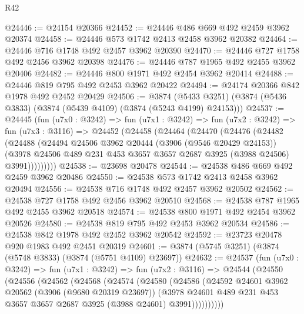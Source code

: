 \begin{lexlean}{R42}
\begin{coremodule}
@24446 := @24154 @20366
@24452 := @24446 @486 @669 @492 @2459 @3962 @20374
@24458 := @24446 @573 @1742 @2413 @2458 @3962 @20382
@24464 := @24446 @716 @1748 @492 @2457 @3962 @20390
@24470 := @24446 @727 @1758 @492 @2456 @3962 @20398
@24476 := @24446 @787 @1965 @492 @2455 @3962 @20406
@24482 := @24446 @800 @1971 @492 @2454 @3962 @20414
@24488 := @24446 @819 @795 @492 @2453 @3962 @20422
@24494 := @24174 @20366 @842 @1978 @492 @2452 @20429
@24506 := @3874
    (@5433 @3251)
    (@3874 (@5436 @3833) (@3874 (@5439 @4109) (@3874 (@5243 @4199) @24153)))
@24537 := @24445
    (fun (u7x0 : @3242) =>
    fun (u7x1 : @3242) =>
    fun (u7x2 : @3242) =>
    fun (u7x3 : @3116) =>
    @24452
      (@24458
        (@24464
          (@24470
            (@24476
              (@24482
                (@24488
                  (@24494
                    @24506
                    @3962
                    @20444
                    (@3906 (@9546 @20429 @24153))
                    (@3978
                      @24506
                      @489
                      @231
                      @453
                      @3657
                      @3657
                      @2687
                      @3925
                      (@3988 @24506)
                      @3991)))))))))
@24538 := @23698 @20478
@24544 := @24538 @486 @669 @492 @2459 @3962 @20486
@24550 := @24538 @573 @1742 @2413 @2458 @3962 @20494
@24556 := @24538 @716 @1748 @492 @2457 @3962 @20502
@24562 := @24538 @727 @1758 @492 @2456 @3962 @20510
@24568 := @24538 @787 @1965 @492 @2455 @3962 @20518
@24574 := @24538 @800 @1971 @492 @2454 @3962 @20526
@24580 := @24538 @819 @795 @492 @2453 @3962 @20534
@24586 := @24538 @842 @1978 @492 @2452 @3962 @20542
@24592 := @23723 @20478 @920 @1983 @492 @2451 @20319
@24601 := @3874 (@5745 @3251) (@3874 (@5748 @3833) (@3874 (@5751 @4109) @23697))
@24632 := @24537
    (fun (u7x0 : @3242) =>
    fun (u7x1 : @3242) =>
    fun (u7x2 : @3116) =>
    @24544
      (@24550
        (@24556
          (@24562
            (@24568
              (@24574
                (@24580
                  (@24586
                    (@24592
                      @24601
                      @3962
                      @20562
                      (@3906 (@9680 @20319 @23697))
                      (@3978
                        @24601
                        @489
                        @231
                        @453
                        @3657
                        @3657
                        @2687
                        @3925
                        (@3988 @24601)
                        @3991))))))))))

\end{coremodule}
\end{lexlean}
